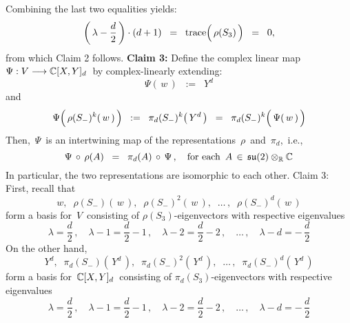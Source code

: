 Combining the last two equalities yields:
\begin{equation*}
\left(\,\lambda - \dfrac{d}{2}\,\right)\cdot(d+1)
\;\; = \;\;
	\trace\!\left(\,\overset{{\color{white}1}}{\rho}(S_{3})\,\right)
\;\; = \;\;
	0,
\end{equation*}
from which Claim 2 follows.
\vskip 0.5cm
\noindent
\textbf{Claim 3:}\quad
Define the complex linear map
\,$\Psi : V \longrightarrow \mathbb{C}[X,Y]_{d}$\,
by complex-linearly extending:
\begin{equation*}
\Psi(\,w\,) \;\; := \;\; Y^{d}
\end{equation*}
and
\begin{equation*}
\Psi\!\left(\,\rho(S_{-})^{k}(\,\overset{{\color{white}1}}{w}\,)\,\right)
\;\; := \;\;
	\pi_{d}(S_{-})^{k}\!\left(\,Y^{d}\,\right)
\;\; = \;\;
	\pi_{d}(S_{-})^{k}\!\left(\,\Psi(\,\overset{{\color{white}1}}{w}\,)\,\right)
\end{equation*}
Then, \,$\Psi$\, is an intertwining map of the representations
\,$\rho$\, and \,$\pi_{d}$,\, i.e.,
\begin{equation*}
\Psi \,\circ\, \rho(A)
\;\; = \;\;
	\pi_{d}(A) \,\circ\, \Psi\,,
\quad
\textnormal{for each \,$A \,\in\, \mathfrak{su}(2) \otimes_{\mathbb{R}} \mathbb{C}$}
\end{equation*}
In particular, the two representations are isomorphic to each other.
\vskip 0.1cm
\noindent
\proofof Claim 3:\quad
First, recall that
\begin{equation*}
w,\;\; \rho(S_{-})(\,w\,),\;\; \rho(S_{-})^{2}(\,w\,),\;\; \ldots\,,\;\; \rho(S_{-})^{d}(\,w\,)
\end{equation*}
form a basis for \,$V$\, consisting of $\rho(S_{3})$-eigenvectors with respective eigenvalues
\begin{equation*}
\lambda = \dfrac{d}{2}\,,
\quad
\lambda - 1 = \dfrac{d}{2} -1\,,
\quad
\lambda - 2 = \dfrac{d}{2} -2\,,
\quad
\ldots\,,
\quad
\lambda - d = -\,\dfrac{d}{2}
\end{equation*}
On the other hand,
\begin{equation*}
Y^{d},\;\; \pi_{d}(S_{-})(\,Y^{d}\,),\;\; \pi_{d}(S_{-})^{2}(\,Y^{d}\,),\;\; \ldots\,,\;\; \pi_{d}(S_{-})^{d}(\,Y^{d}\,)
\end{equation*}
form a basis for \,$\mathbb{C}[X,Y]_{d}$\, consisting of $\pi_{d}(S_{3})$-eigenvectors with respective eigenvalues
\begin{equation*}
\lambda = \dfrac{d}{2}\,,
\quad
\lambda - 1 = \dfrac{d}{2} -1\,,
\quad
\lambda - 2 = \dfrac{d}{2} -2\,,
\quad
\ldots\,,
\quad
\lambda - d = -\,\dfrac{d}{2}
\end{equation*}
